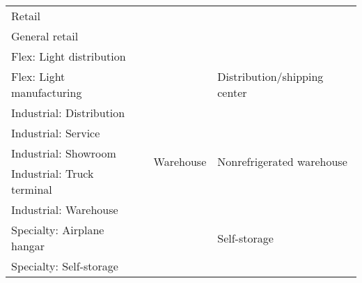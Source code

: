 \begin{table}
\begin{tabular}{|p{4.25cm}|p{3.5cm}|p{3.25cm}|p{4.25cm}|}
Retail                                                &                                                 &                                           &                                                 \\ \cline{1-1}
General retail                                        &                                                 &                                           &                                                 \\ \cline{1-1} \cline{3-4} 
Flex: Light distribution                              &                                                 & \multirow{9}{*}{Warehouse}                & \multirow{3}{*}{Distribution/shipping center}   \\ \cline{1-1}
Flex: Light manufacturing                             &                                                 &                                           &                                                 \\ \cline{1-1}
Industrial: Distribution                              &                                                 &                                           &                                                 \\ \cline{1-1} \cline{4-4} 
Industrial: Service                                   &                                                 &                                           & \multirow{3}{*}{Nonrefrigerated warehouse}     \\ \cline{1-1}
Industrial: Showroom                                  &                                                 &                                           &                                                 \\ \cline{1-1}
Industrial: Truck terminal                            &                                                 &                                           &                                                 \\ \cline{1-1} \cline{4-4} 
Industrial: Warehouse                                 &                                                 &                                           & \multirow{3}{*}{Self-storage}                   \\ \cline{1-1}
Specialty: Airplane hangar                            &                                                 &                                           &                                                 \\ \cline{1-1}
Specialty: Self-storage                               &                                                 &                                           &                                                 \\ \hline
\end{tabular}
\end{table}